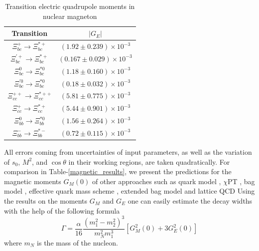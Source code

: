 \begin{table}[ht!]
    \centering
    \begin{tabular}{|c|c|}
        \hline
         Transition & $|G_E|$  \\
         \hline
         $\Xi_{bc}^+\rightarrow\Xi_{bc}^{\ast+}$& $\left( 1.92\pm0.239\right)\times10^{-3}$\\
         \hline
         $\Xi_{bc}^{\prime+}\rightarrow\Xi_{bc}^{\ast+}$& $\left( 0.167\pm0.029\right)\times10^{-3}$\\
         \hline
         $\Xi_{bc}^0\rightarrow\Xi_{bc}^{\ast0}$& $\left( 1.18\pm0.160\right)\times10^{-3}$\\
         \hline
         $\Xi_{bc}^{\prime0}\rightarrow\Xi_{bc}^{\ast0}$& $\left( 0.18\pm0.032\right)\times10^{-3}$\\
         \hline
         $\Xi_{cc}^{++}\rightarrow\Xi_{cc}^{\ast++}$& $\left( 5.81\pm0.775\right)\times10^{-3}$\\
         \hline
         $\Xi_{cc}^+\rightarrow\Xi_{cc}^{\ast+}$& $\left( 5.44\pm0.901\right)\times10^{-3}$\\
         \hline
         $\Xi_{bb}^0\rightarrow\Xi_{bb}^{\ast0}$& $\left( 1.56\pm0.264\right)\times10^{-3}$ \\
         \hline
         $\Xi_{bb}^-\rightarrow\Xi_{bb}^{\ast-}$& $\left( 0.72\pm0.115\right)\times10^{-3}$ \\
        \hline
    \end{tabular}
    \caption{Transition electric quadrupole moments in nuclear magneton}
    \label{electric_results}
\end{table}
 All errors coming from uncertainties of input parameters, as well as the variation of $s_0$, $M^2$, and $\cos\theta$ in their working regions, are taken quadratically. For comparison in Table-\ref{magnetic_results}, we present the predictions for the magnetic moments $G_M(0)$ of other approaches such as quark model \cite{transition15}, $\chi$PT \cite{transition15}, bag model \cite{transition10}, effective quark mass scheme \cite{DhirEMS}, extended bag model \cite{exBag} and lattice QCD \cite{lattice}
Using the results on the moments $G_M$ and $G_E$ one can easily estimate the decay widths with the help of the following formula
\begin{equation}
    \Gamma = \dfrac{\alpha}{16}\dfrac{\left(m_1^2-m_2^2\right)^3}{m_N^2m_1^3}\left[G_M^2(0)+3G_E^2(0)\right]
    \label{decay_width_formula}
\end{equation}
where $m_N$ is the mass of the nucleon.
